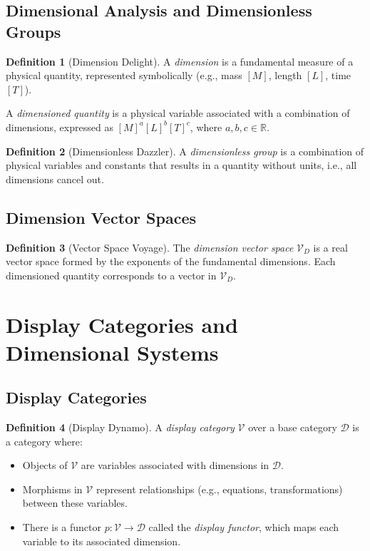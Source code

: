 \documentclass{article}
\theoremstyle{definition}
\newtheorem{definition}{Definition}[section]
\theoremstyle{remark}
\begin{document}
	\subsection{Dimensional Analysis and Dimensionless Groups}
	
	\begin{definition}[Dimension Delight]
		A \emph{dimension} is a fundamental measure of a physical quantity, represented symbolically (e.g., mass $[M]$, length $[L]$, time $[T]$).
		
		A \emph{dimensioned quantity} is a physical variable associated with a combination of dimensions, expressed as $[M]^a[L]^b[T]^c$, where $a, b, c \in \mathbb{R}$.
	\end{definition}
	
	\begin{definition}[Dimensionless Dazzler]
		A \emph{dimensionless group} is a combination of physical variables and constants that results in a quantity without units, i.e., all dimensions cancel out.
	\end{definition}
	
	\subsection{Dimension Vector Spaces}
	
	\begin{definition}[Vector Space Voyage]
		The \emph{dimension vector space} $\mathcal{V}_D$ is a real vector space formed by the exponents of the fundamental dimensions. Each dimensioned quantity corresponds to a vector in $\mathcal{V}_D$.
	\end{definition}
	
	\section{Display Categories and Dimensional Systems}
	
	\subsection{Display Categories}
	
	\begin{definition}[Display Dynamo]
		A \emph{display category} $\mathcal{V}$ over a base category $\mathcal{D}$ is a category where:
		\begin{itemize}
			\item Objects of $\mathcal{V}$ are variables associated with dimensions in $\mathcal{D}$.
			\item Morphisms in $\mathcal{V}$ represent relationships (e.g., equations, transformations) between these variables.
			\item There is a functor $p: \mathcal{V} \rightarrow \mathcal{D}$ called the \emph{display functor}, which maps each variable to its associated dimension.
		\end{itemize}
	\end{definition}
	
\end{document}
